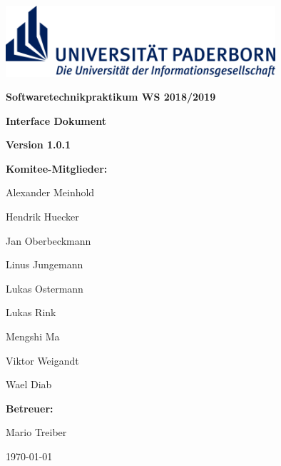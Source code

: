 \documentclass[a4paper, 12pt]{report}
\begin{document}
\begin{titlepage}
	\centering
	\includegraphics[width=0.75\textwidth]{media/logo}\par\vspace{1cm}
	{\bfseries\large Softwaretechnikpraktikum WS 2018/2019\par}
	\vspace{1.5cm}
	{\bfseries\LARGE Interface Dokument\par}
	\vspace{1cm}
	{\bfseries\small Version 1.0.1 \par}
	\vspace{4cm}
	{\bfseries Komitee-Mitglieder:}\par
	\vspace{0.5cm}
	Alexander Meinhold\par
	Hendrik Huecker\par
	Jan Oberbeckmann\par
	Linus Jungemann\par
	Lukas Ostermann\par
	Lukas Rink\par
	Mengshi Ma\par
	Viktor Weigandt\par
	Wael Diab\par
	\vspace{0.25cm}
	{\bfseries Betreuer:}\par
	\vspace{0.25cm}
	Mario Treiber\par
	\vfill
	{ \today \par}

\end{titlepage}
\end{document}

